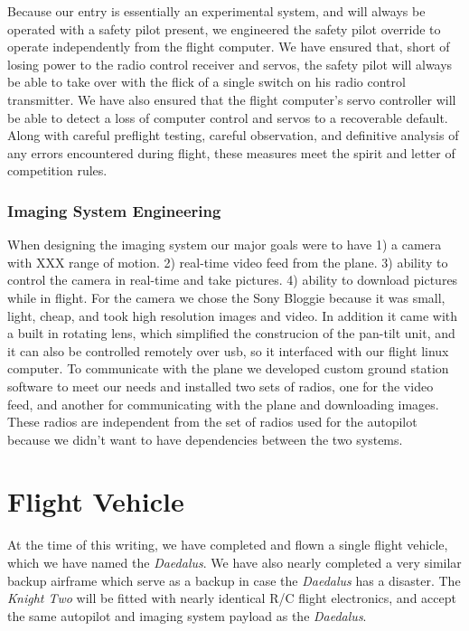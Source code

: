 \documentclass[10pt,twocolumns]{report}
\begin{document}
Because our entry is essentially an experimental system, and will always be operated with a safety pilot present, we engineered the safety pilot override to operate independently from the flight computer. We have ensured that, short of losing power to the radio control receiver and servos, the safety pilot will always be able to take over with the flick of a single switch on his radio control transmitter. We have also ensured that the flight computer's servo controller will be able to detect a loss of computer control and servos to a recoverable default. Along with careful preflight testing, careful observation, and definitive analysis of any errors encountered during flight, these measures meet the spirit and letter of competition rules.

\subsubsection{Imaging System Engineering}

When designing the imaging system our major goals were to have 1) a camera with XXX range of motion.  2) real-time video feed from the plane.  3) ability to control the camera in real-time and take pictures.  4) ability to download pictures while in flight.  For the camera we chose the Sony Bloggie \cite{bloggie} because it was small, light, cheap, and took high resolution images and video.  In addition it came with a built in rotating lens, which simplified the construcion of the pan-tilt unit, and it can also be controlled remotely over usb, so it interfaced with our flight linux computer.  To communicate with the plane we developed custom ground station software to meet our needs and installed two sets of radios, one for the video feed, and another for communicating with the plane and downloading images.  These radios are independent from the set of radios used for the autopilot because we didn't want to have dependencies between the two systems.

\section{Flight Vehicle}

At the time of this writing, we have completed and flown a single flight vehicle, which we have named the \emph{Daedalus}.
We have also nearly completed a very similar backup airframe which serve as a backup in case the \emph{Daedalus} has a disaster. The \emph{Knight Two} will be fitted with nearly identical R/C flight electronics, and accept the same autopilot and imaging system payload as the \emph{Daedalus}.
\end{document}
